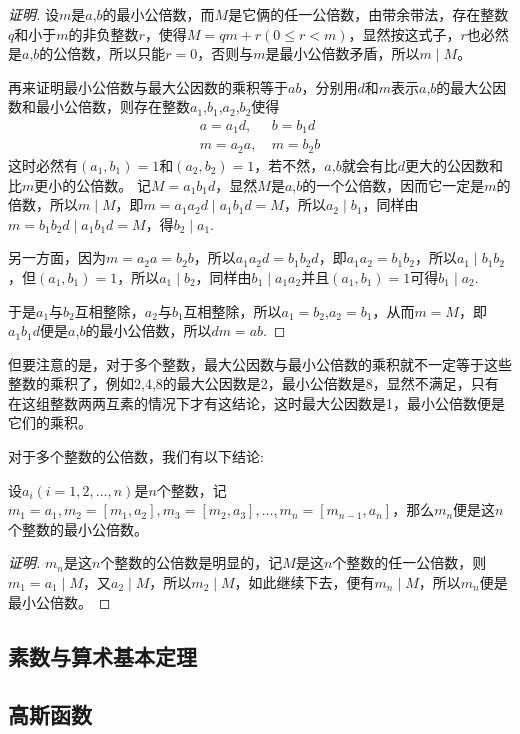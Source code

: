 \begin{proof}[证明]
  设$m$是$a$,$b$的最小公倍数，而$M$是它俩的任一公倍数，由带余带法，存在整数$q$和小于$m$的非负整数$r$，使得$M=qm+r(0 \leqslant r <m)$，显然按这式子，$r$也必然是$a$,$b$的公倍数，所以只能$r=0$，否则与$m$是最小公倍数矛盾，所以$m\mid M$。

  再来证明最小公倍数与最大公因数的乘积等于$ab$，分别用$d$和$m$表示$a$,$b$的最大公因数和最小公倍数，则存在整数$a_1$,$b_1$,$a_2$,$b_2$使得
  \begin{align*}
    a = a_1d, & \  b = b_1d \\
    m = a_2a, & \  m = b_2b
  \end{align*}
  这时必然有$(a_1,b_1)=1$和$(a_2,b_2)=1$，若不然，$a$,$b$就会有比$d$更大的公因数和比$m$更小的公倍数。
  记$M=a_1b_1d$，显然$M$是$a$,$b$的一个公倍数，因而它一定是$m$的倍数，所以$m \mid M$，即$m=a_1a_2d \mid a_1b_1d = M$，所以$a_2 \mid b_1$，同样由$m=b_1b_2d \mid a_1b_1d = M$，得$b_2 \mid a_1$.

  另一方面，因为$m=a_2a=b_2b$，所以$a_1a_2d=b_1b_2d$，即$a_1a_2=b_1b_2$，所以$a_1 \mid b_1b_2$，但$(a_1,b_1)=1$，所以$a_1 \mid b_2$，同样由$b_1 \mid a_1a_2$并且$(a_1,b_1)=1$可得$b_1 \mid a_2$.

  于是$a_1$与$b_2$互相整除，$a_2$与$b_1$互相整除，所以$a_1=b_2$,$a_2=b_1$，从而$m=M$，即$a_1b_1d$便是$a$,$b$的最小公倍数，所以$dm=ab$.
\end{proof}

但要注意的是，对于多个整数，最大公因数与最小公倍数的乘积就不一定等于这些整数的乘积了，例如2,4,8的最大公因数是2，最小公倍数是8，显然不满足，只有在这组整数两两互素的情况下才有这结论，这时最大公因数是1，最小公倍数便是它们的乘积。

对于多个整数的公倍数，我们有以下结论:
\begin{theorem}
  设$a_i(i=1,2,\ldots,n)$是$n$个整数，记$m_1=a_1, m_2=[m_1,a_2], m_3=[m_2,a_3],\ldots,m_n=[m_{n-1},a_n]$，那么$m_n$便是这$n$个整数的最小公倍数。
\end{theorem}

\begin{proof}[证明]
  $m_n$是这$n$个整数的公倍数是明显的，记$M$是这$n$个整数的任一公倍数，则$m_1 = a_1 \mid M$，又$a_2 \mid M$，所以$m_2 \mid M$，如此继续下去，便有$m_n \mid M$，所以$m_n$便是最小公倍数。
\end{proof}

\subsection{素数与算术基本定理}
\label{sec:prime-number-and-fundamental-theorem-of-arithmetic}

\subsection{高斯函数}
\label{sec:gauss-function}


